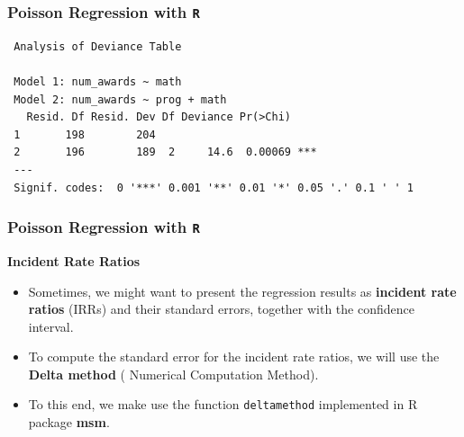 \documentclass[00-GLMregslides.tex]{subfiles}
\begin{document}
\begin{frame}[fragile]

\frametitle{Poisson Regression with \texttt{R}}
\large

\begin{framed}
\begin{verbatim}
 Analysis of Deviance Table
 
 Model 1: num_awards ~ math
 Model 2: num_awards ~ prog + math
   Resid. Df Resid. Dev Df Deviance Pr(>Chi)    
 1       198        204                         
 2       196        189  2     14.6  0.00069 ***
 ---
 Signif. codes:  0 '***' 0.001 '**' 0.01 '*' 0.05 '.' 0.1 ' ' 1
\end{verbatim}
\end{framed}
\end{frame}

\begin{frame}[fragile]

\frametitle{Poisson Regression with \texttt{R}}
\Large 
\textbf{Incident Rate Ratios}
\begin{itemize}
\item Sometimes, we might want to present the regression results as \textbf{incident rate ratios} (IRRs) and 
their standard errors, together with the confidence interval. 
\item To compute the standard error for the incident rate ratios, we will use the \textbf{Delta method} ( Numerical Computation Method). 
\item To this end, we make use the function \texttt{deltamethod} implemented in R package \textbf{msm}.
\end{itemize}
\end{frame}
\end{document}
